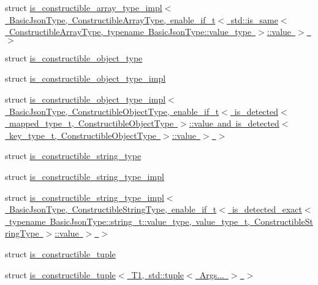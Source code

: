 \begin{DoxyCompactItemize}
\item 
struct \mbox{\hyperlink{structnlohmann_1_1detail_1_1is__constructible__array__type__impl_3_01BasicJsonType_00_01Construce6fa33688da703b95649da4749cdeb98}{is\+\_\+constructible\+\_\+array\+\_\+type\+\_\+impl$<$ Basic\+Json\+Type, Constructible\+Array\+Type, enable\+\_\+if\+\_\+t$<$ std\+::is\+\_\+same$<$ Constructible\+Array\+Type, typename Basic\+Json\+Type\+::value\+\_\+type $>$\+::value $>$ $>$}}
\item 
struct \mbox{\hyperlink{structnlohmann_1_1detail_1_1is__constructible__object__type}{is\+\_\+constructible\+\_\+object\+\_\+type}}
\item 
struct \mbox{\hyperlink{structnlohmann_1_1detail_1_1is__constructible__object__type__impl}{is\+\_\+constructible\+\_\+object\+\_\+type\+\_\+impl}}
\item 
struct \mbox{\hyperlink{structnlohmann_1_1detail_1_1is__constructible__object__type__impl_3_01BasicJsonType_00_01Construb7f96efbcfd2606ccb5c84a830a60036}{is\+\_\+constructible\+\_\+object\+\_\+type\+\_\+impl$<$ Basic\+Json\+Type, Constructible\+Object\+Type, enable\+\_\+if\+\_\+t$<$ is\+\_\+detected$<$ mapped\+\_\+type\+\_\+t, Constructible\+Object\+Type $>$\+::value and is\+\_\+detected$<$ key\+\_\+type\+\_\+t, Constructible\+Object\+Type $>$\+::value $>$ $>$}}
\item 
struct \mbox{\hyperlink{structnlohmann_1_1detail_1_1is__constructible__string__type}{is\+\_\+constructible\+\_\+string\+\_\+type}}
\item 
struct \mbox{\hyperlink{structnlohmann_1_1detail_1_1is__constructible__string__type__impl}{is\+\_\+constructible\+\_\+string\+\_\+type\+\_\+impl}}
\item 
struct \mbox{\hyperlink{structnlohmann_1_1detail_1_1is__constructible__string__type__impl_3_01BasicJsonType_00_01Construe4743afb22172cdb3c5f428800835387}{is\+\_\+constructible\+\_\+string\+\_\+type\+\_\+impl$<$ Basic\+Json\+Type, Constructible\+String\+Type, enable\+\_\+if\+\_\+t$<$ is\+\_\+detected\+\_\+exact$<$ typename Basic\+Json\+Type\+::string\+\_\+t\+::value\+\_\+type, value\+\_\+type\+\_\+t, Constructible\+String\+Type $>$\+::value $>$ $>$}}
\item 
struct \mbox{\hyperlink{structnlohmann_1_1detail_1_1is__constructible__tuple}{is\+\_\+constructible\+\_\+tuple}}
\item 
struct \mbox{\hyperlink{structnlohmann_1_1detail_1_1is__constructible__tuple_3_01T1_00_01std_1_1tuple_3_01Args_8_8_8_01_4_01_4}{is\+\_\+constructible\+\_\+tuple$<$ T1, std\+::tuple$<$ Args... $>$ $>$}}

\end{DoxyCompactItemize}
